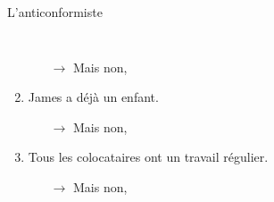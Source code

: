 \begin{frame}{L'anticonformiste}
\begin{columns}[t]
\begin{enumerate}
        \begin{itemize}
          \scriptsize
          \item[$\to$] Mais non, 
        \end{itemize}
        \item James a \alert{déjà} un enfant.
        \begin{itemize}
          \scriptsize
          \item[$\to$] Mais non, 
        \end{itemize}
        \item \alert{Tous les colocataires} ont un travail régulier.
        \begin{itemize}
          \scriptsize
          \item[$\to$] Mais non, 
        \end{itemize}
      \end{enumerate}
  \end{columns}
\end{frame}